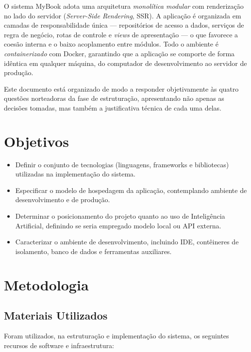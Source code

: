 \documentclass[a4paper,12pt]{article}
\begin{document}
O sistema MyBook adota uma arquitetura \emph{monolítica modular} com renderização no
lado do servidor (\emph{Server-Side Rendering}, SSR). A aplicação é organizada em
camadas de responsabilidade única --- repositórios de acesso a dados, serviços de
regra de negócio, rotas de controle e \emph{views} de apresentação --- o que favorece
a coesão interna e o baixo acoplamento entre módulos. Todo o ambiente é
\emph{containerizado} com Docker, garantindo que a aplicação se comporte de forma
idêntica em qualquer máquina, do computador de desenvolvimento ao servidor de produção.

Este documento está organizado de modo a responder objetivamente às quatro questões
norteadoras da fase de estruturação, apresentando não apenas as decisões tomadas, mas
também a justificativa técnica de cada uma delas.

\section{Objetivos}

\begin{itemize}[leftmargin=2em]
    \item Definir o conjunto de tecnologias (linguagens, frameworks e bibliotecas)
    utilizadas na implementação do sistema.
    \item Especificar o modelo de hospedagem da aplicação, contemplando ambiente de
    desenvolvimento e de produção.
    \item Determinar o posicionamento do projeto quanto ao uso de Inteligência
    Artificial, definindo se seria empregado modelo local ou API externa.
    \item Caracterizar o ambiente de desenvolvimento, incluindo IDE, contêineres de
    isolamento, banco de dados e ferramentas auxiliares.
\end{itemize}

\section{Metodologia}

\subsection{Materiais Utilizados}

Foram utilizados, na estruturação e implementação do sistema, os seguintes recursos de
software e infraestrutura:
\end{document}
